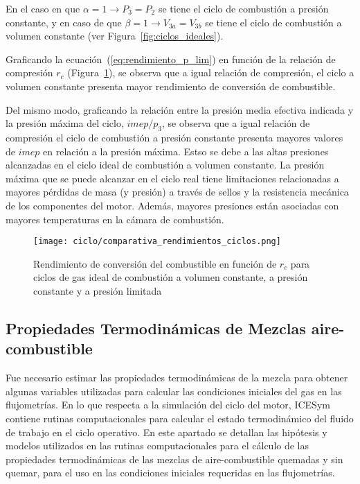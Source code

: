 En el caso en que  $\alpha=1 \rightarrow P_3=P_2$ se tiene el ciclo de
combustión a presión constante, y en caso de que
$\beta=1 \rightarrow V_{3a}=V_{3b}$ se tiene el ciclo de combustión a volumen
constante (ver Figura~\ref{fig:ciclos_ideales}).

Graficando la ecuación~(\ref{eq:rendimiento_p_lim}) en función de la relación de
compresión $r_c$ (Figura~\ref{fig:rendimientos}), se observa que a igual
relación de compresión, el ciclo a volumen constante presenta mayor rendimiento
de conversión de combustible.

Del mismo modo, graficando la relación entre la presión media efectiva indicada
y la presión máxima del ciclo, $imep/p_3$, se observa que a igual relación de
compresión el ciclo de combustión a presión constante presenta mayores valores
de $imep$ en relación a la presión máxima.
%
Estso se debe a las altas presiones alcanzadas en el ciclo ideal de combustión a
volumen constante.
%
La presión máxima que se puede alcanzar en el ciclo real tiene limitaciones
relacionadas a mayores pérdidas de masa (y presión) a través de sellos y la
resistencia mecánica de los componentes del motor.
%
Además, mayores presiones están asociadas con mayores temperaturas en la cámara
de combustión.

\begin{figure}[h!]
  \centering
\texttt{[image: ciclo/comparativa\_rendimientos\_ciclos.png]}
    \caption{Rendimiento de conversión del combustible en función de $r_c$ para
ciclos de gas ideal de combustión a volumen constante, a presión constante y a
presión limitada~\parencite{heywood}} \label{fig:rendimientos}
\end{figure}


\subsection{Propiedades Termodinámicas de Mezclas aire-combustible}\label{subsec:prop_mezcla}
%
Fue necesario estimar las propiedades termodinámicas de la mezcla para obtener
algunas variables utilizadas para calcular las condiciones iniciales del gas en
las flujometrías.
%
En lo que respecta a la simulación del ciclo del motor, ICESym contiene rutinas
computacionales para calcular el estado termodinámico del fluido de trabajo en
el ciclo operativo.
%
En este apartado se detallan las hipótesis y modelos utilizados en las rutinas
computacionales para el cálculo de las propiedades termodinámicas de las mezclas
de aire-combustible quemadas y sin quemar, para el uso en las condiciones
iniciales requeridas en las flujometrías.

